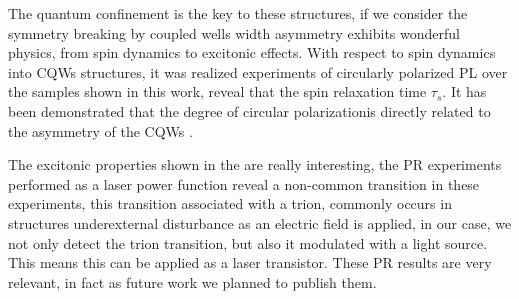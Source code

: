 The quantum confinement is the key to these structures, if we consider the symmetry breaking by coupled wells width asymmetry exhibits wonderful physics, from spin dynamics to excitonic effects. With respect to spin dynamics into CQWs structures, it was realized
experiments of circularly polarized PL over the samples shown in this work, reveal that the
spin relaxation time $\tau_s$. It has been demonstrated that the degree of circular polarizationis directly related to the asymmetry of the CQWs \cite{bravo2022photoluminiscence}.

The excitonic properties shown in the  are really interesting, the PR
experiments performed as a laser power function reveal a non-common transition in these experiments, this transition associated with a trion, commonly occurs in structures underexternal disturbance as an electric field is applied, in our case, we not only detect the trion transition, but also it modulated with a light source. This means this can be applied as a laser transistor. These \gls{PR} results are very relevant, in fact as future work we planned
to publish them.


